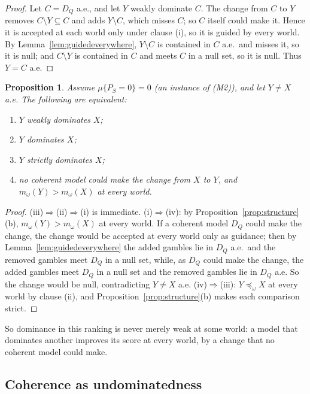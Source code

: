 \documentclass[11pt]{article}
\theoremstyle{plain}
\newtheorem{proposition}[theorem]{Proposition}
\theoremstyle{definition}
\theoremstyle{remark}
\begin{document}
\begin{proof}
Let $C=D_Q$ a.e., and let $Y$ weakly dominate $C$. The change from $C$ to $Y$ removes $C
\setminus Y\subseteq C$ and adds $Y\setminus C$, which misses $C$; so $C$ itself could make
it. Hence it is accepted at each world only under clause (i), so it is guided by every world.
By Lemma~\ref{lem:guidedeverywhere}, $Y\setminus C$ is contained in $C$ a.e.\ and misses it, so
it is null; and $C\setminus Y$ is contained in $C$ and meets $C$ in a null set, so it is null.
Thus $Y=C$ a.e.
\end{proof}

\begin{proposition}\label{prop:strict}
Assume $\mu\{P_S=0\}=0$ (an instance of (M2)), and let $Y\ne X$ a.e. The following are
equivalent:
\begin{enumerate}[label=(\roman*)]
  \item $Y$ weakly dominates $X$;
  \item $Y$ dominates $X$;
  \item $Y$ strictly dominates $X$;
  \item no coherent model could make the change from $X$ to $Y$, and $m_\omega(Y)>m_\omega(X)$
  at every world.
\end{enumerate}
\end{proposition}

\begin{proof}
(iii)$\Rightarrow$(ii)$\Rightarrow$(i) is immediate. (i)$\Rightarrow$(iv): by
Proposition~\ref{prop:structure}(b), $m_\omega(Y)>m_\omega(X)$ at every world. If a coherent
model $D_Q$ could make the change, the change would be accepted at every world only as
guidance; then by Lemma~\ref{lem:guidedeverywhere} the added gambles lie in $D_Q$ a.e.\ and the
removed gambles meet $D_Q$ in a null set, while, as $D_Q$ could make the change, the added
gambles meet $D_Q$ in a null set and the removed gambles lie in $D_Q$ a.e. So the change would
be null, contradicting $Y\ne X$ a.e. (iv)$\Rightarrow$(iii): $Y\preceq_\omega X$ at every world
by clause (ii), and Proposition~\ref{prop:structure}(b) makes each comparison strict.
\end{proof}

So dominance in this ranking is never merely weak at some world: a model that dominates another
improves its score at every world, by a change that no coherent model could make.

\subsection{Coherence as undominatedness}\label{sec:undominated}
\end{document}
